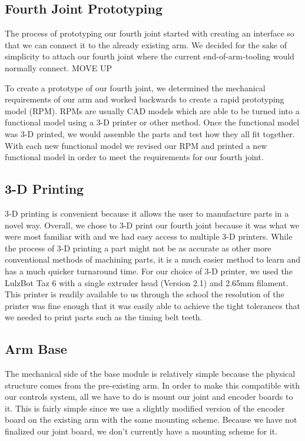 \subsection{Fourth Joint Prototyping}
The process of prototyping our fourth joint started with creating an interface so that we can connect it to the already existing arm.  We decided for the sake of simplicity to attach our fourth joint where the current end-of-arm-tooling would normally connect. MOVE UP

To create a prototype of our fourth joint, we determined the mechanical requirements of our arm and worked backwards to create a rapid prototyping model (RPM).  RPMs are usually CAD models which are able to be turned into a functional model using a 3-D printer or other method.  Once the functional model was 3-D printed, we would assemble the parts and test how they all fit together.  With each new functional model we revised our RPM and printed a new functional model in order to meet the requirements for our fourth joint.  

\subsection{3-D Printing}
3-D printing is convenient because it allows the user to manufacture parts in a novel way. Overall, we chose to 3-D print our fourth joint because it was what we were most familiar with and we had easy access to multiple 3-D printers.  While the process of 3-D printing a part might not be as accurate as other more conventional methods of machining parts, it is a much easier method to learn and has a much quicker turnaround time. For our choice of 3-D printer, we used the LulzBot Taz 6 with a single extruder head (Version 2.1) and 2.65mm filament. This printer is readily available to us through the school the resolution of the printer was fine enough that it was easily able to achieve the tight tolerances that we needed to print parts such as the timing belt teeth.    

\subsection{Arm Base}
The mechanical side of the base module is relatively simple because the physical structure comes from the pre-existing arm. In order to make this compatible with our controls system, all we have to do is mount our joint and encoder boards to it.  This is fairly simple since we use a slightly modified version of the encoder board on the existing arm with the same mounting scheme. Because we have not finalized our joint board, we don't currently have a mounting scheme for it. 

